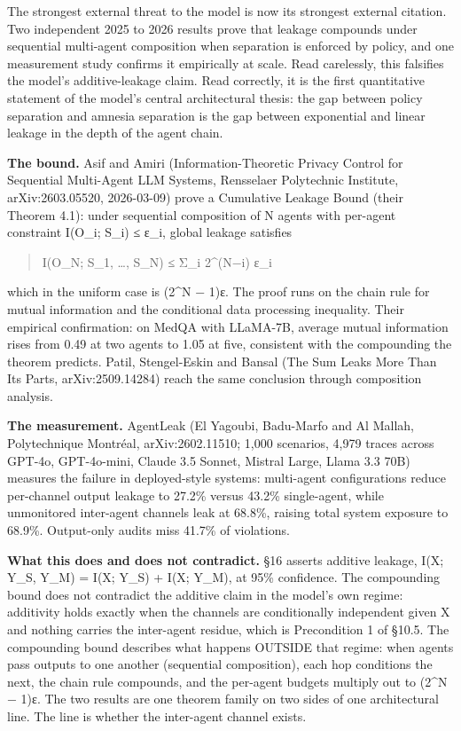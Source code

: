 \documentclass[
]{article}
\begin{document}
The strongest external threat to the model is now its strongest external
citation. Two independent 2025 to 2026 results prove that leakage
compounds under sequential multi-agent composition when separation is
enforced by policy, and one measurement study confirms it empirically at
scale. Read carelessly, this falsifies the model's additive-leakage
claim. Read correctly, it is the first quantitative statement of the
model's central architectural thesis: the gap between policy separation
and amnesia separation is the gap between exponential and linear leakage
in the depth of the agent chain.

\textbf{The bound.} Asif and Amiri (Information-Theoretic Privacy
Control for Sequential Multi-Agent LLM Systems, Rensselaer Polytechnic
Institute, arXiv:2603.05520, 2026-03-09) prove a Cumulative Leakage
Bound (their Theorem 4.1): under sequential composition of N agents with
per-agent constraint I(O\_i; S\_i) ≤ ε\_i, global leakage satisfies

\begin{quote}
I(O\_N; S\_1, \ldots, S\_N) ≤ Σ\_i 2\^{}(N−i) ε\_i
\end{quote}

which in the uniform case is (2\^{}N − 1)ε. The proof runs on the chain
rule for mutual information and the conditional data processing
inequality. Their empirical confirmation: on MedQA with LLaMA-7B,
average mutual information rises from 0.49 at two agents to 1.05 at
five, consistent with the compounding the theorem predicts. Patil,
Stengel-Eskin and Bansal (The Sum Leaks More Than Its Parts,
arXiv:2509.14284) reach the same conclusion through composition
analysis.

\textbf{The measurement.} AgentLeak (El Yagoubi, Badu-Marfo and Al
Mallah, Polytechnique Montréal, arXiv:2602.11510; 1,000 scenarios, 4,979
traces across GPT-4o, GPT-4o-mini, Claude 3.5 Sonnet, Mistral Large,
Llama 3.3 70B) measures the failure in deployed-style systems:
multi-agent configurations reduce per-channel output leakage to 27.2\%
versus 43.2\% single-agent, while unmonitored inter-agent channels leak
at 68.8\%, raising total system exposure to 68.9\%. Output-only audits
miss 41.7\% of violations.

\textbf{What this does and does not contradict.} §16 asserts additive
leakage, I(X; Y\_S, Y\_M) = I(X; Y\_S) + I(X; Y\_M), at 95\% confidence.
The compounding bound does not contradict the additive claim in the
model's own regime: additivity holds exactly when the channels are
conditionally independent given X and nothing carries the inter-agent
residue, which is Precondition 1 of §10.5. The compounding bound
describes what happens OUTSIDE that regime: when agents pass outputs to
one another (sequential composition), each hop conditions the next, the
chain rule compounds, and the per-agent budgets multiply out to (2\^{}N
− 1)ε. The two results are one theorem family on two sides of one
architectural line. The line is whether the inter-agent channel exists.
\end{document}

